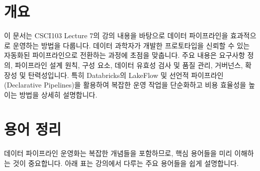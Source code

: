 \documentclass[11pt,a4paper]{article}
\begin{document}
\newpage
\section*{\centering 개요}

\begin{tcolorbox}[summarybox]
이 문서는 CSCI103 Lecture 7의 강의 내용을 바탕으로 데이터 파이프라인을 효과적으로 운영하는 방법을 다룹니다.
데이터 과학자가 개발한 프로토타입을 신뢰할 수 있는 자동화된 파이프라인으로 전환하는 과정에 초점을 맞춥니다.
주요 내용은 요구사항 정의, 파이프라인 설계 원칙, 구성 요소, 데이터 유효성 검사 및 품질 관리, 거버넌스, 확장성 및 탄력성입니다.
특히 Databricks의 LakeFlow 및 선언적 파이프라인(Declarative Pipelines)을 활용하여 복잡한 운영 작업을 단순화하고 비용 효율성을 높이는 방법을 상세히 설명합니다.
\end{tcolorbox}

\newpage
\section*{\centering 용어 정리}

데이터 파이프라인 운영화는 복잡한 개념들을 포함하므로, 핵심 용어들을 미리 이해하는 것이 중요합니다. 아래 표는 강의에서 다루는 주요 용어들을 쉽게 설명합니다.
\end{document}
